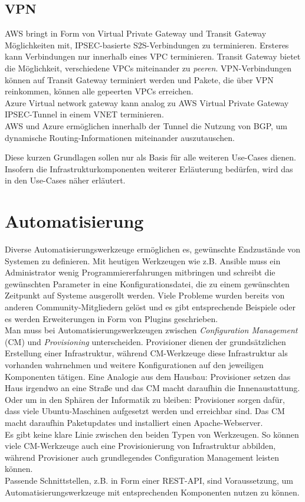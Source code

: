 \subsection{VPN}
AWS bringt in Form von Virtual Private Gateway und Transit Gateway Möglichkeiten mit, IPSEC-basierte S2S-Verbindungen zu terminieren. Ersteres kann Verbindungen nur innerhalb eines VPC terminieren. Transit Gateway bietet die Möglichkeit, verschiedene VPCs miteinander zu \textit{peeren}. VPN-Verbindungen können auf Transit Gateway terminiert werden und Pakete, die über VPN reinkommen, können alle gepeerten VPCs erreichen.\\
Azure Virtual network gateway kann analog zu AWS Virtual Private Gateway IPSEC-Tunnel in einem VNET terminieren.\\
AWS und Azure ermöglichen innerhalb der Tunnel die Nutzung von BGP, um dynamische Routing-Informationen miteinander auszutauschen.

Diese kurzen Grundlagen sollen nur als Basis für alle weiteren Use-Cases dienen. Insofern die Infrastrukturkomponenten weiterer Erläuterung bedürfen, wird das in den Use-Cases näher erläutert.

\section{Automatisierung}\label{automatisierung}

Diverse Automatisierungswerkzeuge ermöglichen es, gewünschte Endzustände von Systemen zu definieren. Mit heutigen Werkzeugen wie z.B. Ansible muss ein Administrator wenig Programmiererfahrungen mitbringen und schreibt die gewünschten Parameter in eine Konfigurationsdatei, die zu einem gewünschten Zeitpunkt auf Systeme ausgerollt werden. Viele Probleme wurden bereits von anderen Community-Mitgliedern gelöst und es gibt entsprechende Beispiele oder es werden Erweiterungen in Form von Plugins geschrieben.\\
Man muss bei Automatisierungswerkzeugen zwischen \textit{Configuration Management} (CM) und \textit{Provisioning} unterscheiden. Provisioner dienen der grundsätzlichen Erstellung einer Infrastruktur, während CM-Werkzeuge diese Infrastruktur als vorhanden wahrnehmen und weitere Konfigurationen auf den jeweiligen Komponenten tätigen\cite[S.20]{Brikman2019}. Eine Analogie aus dem Hausbau: Provisioner setzen das Haus irgendwo an eine Straße und das CM macht daraufhin die Innenaustattung. Oder um in den Sphären der Informatik zu bleiben: Provisioner sorgen dafür, dass viele Ubuntu-Maschinen aufgesetzt werden und erreichbar sind. Das CM macht daraufhin Paketupdates und installiert einen Apache-Webserver.\\
Es gibt keine klare Linie zwischen den beiden Typen von Werkzeugen. So können viele CM-Werkzeuge auch eine Provisionierung von Infrastruktur abbilden, während Provisioner auch grundlegendes Configuration Management leisten können\cite[S.20]{Brikman2019}.\\
Passende Schnittstellen, z.B. in Form einer REST-API, sind Voraussetzung, um Automatisierungswerkzeuge mit entsprechenden Komponenten nutzen zu können.

